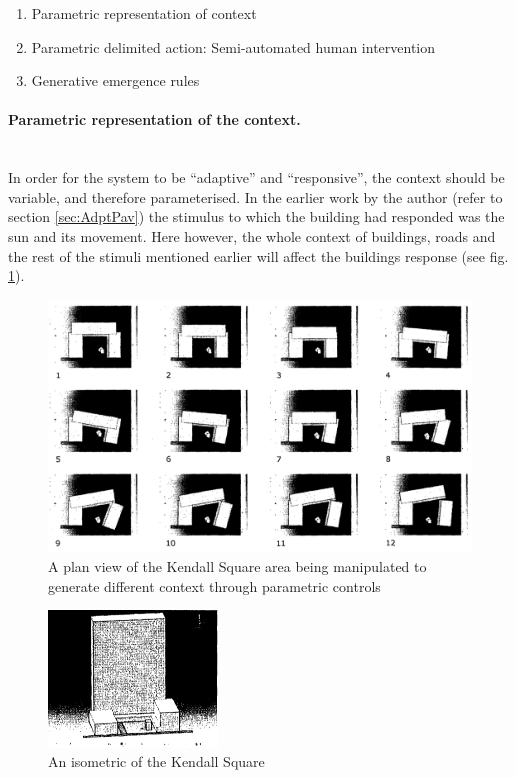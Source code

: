 \begin{enumerate}[nolistsep]
\item Parametric representation of context
\item Parametric delimited action: Semi-automated human intervention
\item Generative emergence rules
\end{enumerate}

\paragraph{Parametric representation of the context.}\mbox{}\\
In order for the system to be ``adaptive'' and ``responsive'', the context should be variable, and therefore parameterised. In the earlier work by the author (refer to section \ref{sec:AdptPav}) the stimulus to which the building had responded was the sun and its movement. Here however, the whole context of buildings, roads and the rest of the stimuli mentioned earlier will affect the buildings response (see fig. \ref{fig:ParametricKendallSq}).

\begin{figure}[htbp]
\centering
\includegraphics[width=\textwidth]{./Images/12-ParametricContext}
\caption[Parametric Context]{A plan view of the Kendall Square area being manipulated to generate different context through parametric controls \cite {zulas04}}
\label{fig:ParametricKendallSq}
\end{figure}

\begin{figure}[htbp]
\centering
\includegraphics[width=0.4\textwidth]{./Images/13-KendallIsometric}
\caption[Kendall Square Isometric]{An isometric of the Kendall Square \cite{zulas04}}
\label{fig:KendallIsom}
\end{figure}

